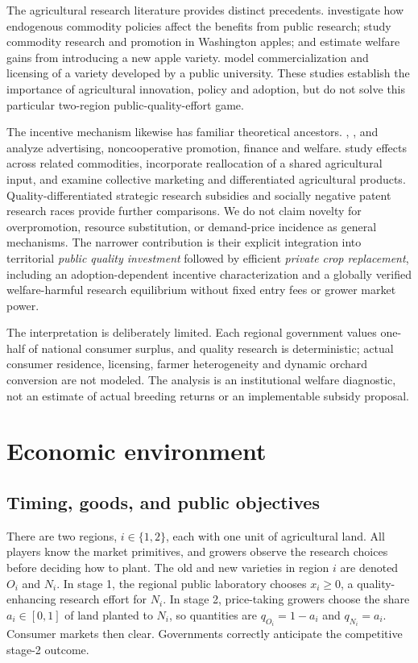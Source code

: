 \documentclass[11pt,a4paper]{article}
\begin{document}
The agricultural research literature provides distinct precedents. \citet{swinnen1998endogenous} investigate how endogenous commodity policies affect the benefits from public research; \citet{richards2002commodity} study commodity research and promotion in Washington apples; and \citet{wang2020honeycrisp} estimate welfare gains from introducing a new apple variety. \citet{akhundjanov2020apple} model commercialization and licensing of a variety developed by a public university. These studies establish the importance of agricultural innovation, policy and adoption, but do not solve this particular two-region public-quality-effort game.

The incentive mechanism likewise has familiar theoretical ancestors. \citet{dixit1978advertising}, \citet{alston2001beggar}, \citet{freebairn2001funding} and \citet{cardon2003market} analyze advertising, noncooperative promotion, finance and welfare. \citet{kinnucan2000distributional} study effects across related commodities, \citet{balagtas2007dairy} incorporate reallocation of a shared agricultural input, and \citet{lence2007collective} examine collective marketing and differentiated agricultural products. Quality-differentiated strategic research subsidies \citep{jinji2013strategic} and socially negative patent research races \citep{zhang2022negative} provide further comparisons. We do not claim novelty for overpromotion, resource substitution, or demand-price incidence as general mechanisms. The narrower contribution is their explicit integration into territorial \emph{public quality investment} followed by efficient \emph{private crop replacement}, including an adoption-dependent incentive characterization and a globally verified welfare-harmful research equilibrium without fixed entry fees or grower market power.

The interpretation is deliberately limited. Each regional government values one-half of national consumer surplus, and quality research is deterministic; actual consumer residence, licensing, farmer heterogeneity and dynamic orchard conversion are not modeled. The analysis is an institutional welfare diagnostic, not an estimate of actual breeding returns or an implementable subsidy proposal.

\section{Economic environment}
\subsection{Timing, goods, and public objectives}
There are two regions, $i\in\{1,2\}$, each with one unit of agricultural land. All players know the market primitives, and growers observe the research choices before deciding how to plant. The old and new varieties in region $i$ are denoted $O_i$ and $N_i$. In stage 1, the regional public laboratory chooses $x_i\geq 0$, a quality-enhancing research effort for $N_i$. In stage 2, price-taking growers choose the share $a_i\in[0,1]$ of land planted to $N_i$, so quantities are $q_{O_i}=1-a_i$ and $q_{N_i}=a_i$. Consumer markets then clear. Governments correctly anticipate the competitive stage-2 outcome.
\end{document}
